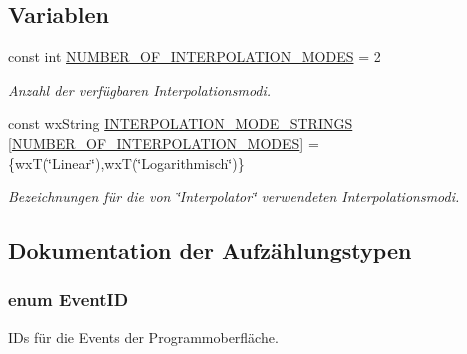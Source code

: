 \subsection*{Variablen}
\begin{DoxyCompactItemize}
\item 
const int \hyperlink{simpleanalyzer-gui_2src_2GUI_2constants_8h_a3671997d94de57843bd6162844cd140a}{N\-U\-M\-B\-E\-R\-\_\-\-O\-F\-\_\-\-I\-N\-T\-E\-R\-P\-O\-L\-A\-T\-I\-O\-N\-\_\-\-M\-O\-D\-E\-S} = 2
\begin{DoxyCompactList}\small\item\em Anzahl der verfügbaren Interpolationsmodi. \end{DoxyCompactList}\item 
const wx\-String \hyperlink{simpleanalyzer-gui_2src_2GUI_2constants_8h_a77ce5a39521911ed3b98226067b87ed6}{I\-N\-T\-E\-R\-P\-O\-L\-A\-T\-I\-O\-N\-\_\-\-M\-O\-D\-E\-\_\-\-S\-T\-R\-I\-N\-G\-S} \mbox{[}\hyperlink{simpleanalyzer-gui_2src_2GUI_2constants_8h_a3671997d94de57843bd6162844cd140a}{N\-U\-M\-B\-E\-R\-\_\-\-O\-F\-\_\-\-I\-N\-T\-E\-R\-P\-O\-L\-A\-T\-I\-O\-N\-\_\-\-M\-O\-D\-E\-S}\mbox{]} = \{wx\-T(\char`\"{}Linear\char`\"{}),wx\-T(\char`\"{}Logarithmisch\char`\"{})\}
\begin{DoxyCompactList}\small\item\em Bezeichnungen für die von \char`\"{}\-Interpolator\char`\"{} verwendeten Interpolationsmodi. \end{DoxyCompactList}\end{DoxyCompactItemize}


\subsection{Dokumentation der Aufzählungstypen}
\hypertarget{simpleanalyzer-gui_2src_2GUI_2constants_8h_ab25acc4990929d49b383f2b7c147f60f}{
\subsubsection[{Event\-I\-D}]{\setlength{\rightskip}{0pt plus 5cm}enum {\bf Event\-I\-D}}}\label{simpleanalyzer-gui_2src_2GUI_2constants_8h_ab25acc4990929d49b383f2b7c147f60f}


I\-Ds für die Events der Programmoberfläche. 

